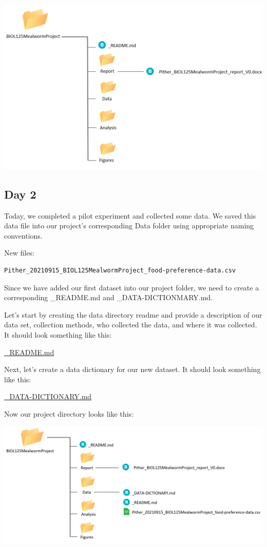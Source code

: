 \documentclass[
]{book}
\begin{document}
\includegraphics{images/DS_directory-example-1.png}

\hypertarget{day-2-1}{%
\subsection*{Day 2}\label{day-2-1}}

Today, we completed a pilot experiment and collected some data. We saved this data file into our project's corresponding Data folder using appropriate naming conventions.

New files:

\begin{verbatim}
Pither_20210915_BIOL125MealwormProject_food-preference-data.csv
\end{verbatim}

Since we have added our first dataset into our project folder, we need to create a corresponding \_README.md and \_DATA-DICTIONMARY.md.

Let's start by creating the data directory readme and provide a description of our data set, collection methods, who collected the data, and where it was collected. It should look something like this:

\href{files/DS_biol-125-data-readme_V0.md}{\_README.md}

Next, let's create a data dictionary for our new dataset. It should look something like this:

\href{files/DS_biol-125-data-dictionary_V0.md}{\_DATA-DICTIONARY.md}

Now our project directory looks like this:

\includegraphics{images/DS_directory-example-2.png}
\end{document}
